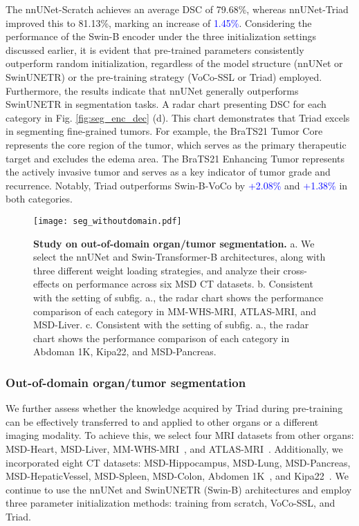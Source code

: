 The nnUNet-Scratch achieves an average DSC of 79.68\%, whereas nnUNet-Triad improved this to 81.13\%, marking an increase of \textcolor{blue}{1.45\%}. Considering the performance of the Swin-B encoder under the three initialization settings discussed earlier, it is evident that pre-trained parameters consistently outperform random initialization, regardless of the model structure (nnUNet or SwinUNETR) or the pre-training strategy (VoCo-SSL or Triad) employed.
Furthermore, the results indicate that nnUNet generally outperforms SwinUNETR in segmentation tasks. A radar chart presenting DSC for each category in Fig. \ref{fig:seg_enc_dec} (d). This chart demonstrates that Triad excels in segmenting fine-grained tumors.
For example, the BraTS21 Tumor Core represents the core region of the tumor, which serves as the primary therapeutic target and excludes the edema area. The BraTS21 Enhancing Tumor represents the actively invasive tumor and serves as a key indicator of tumor grade and recurrence. Notably, Triad outperforms Swin-B-VoCo by \textcolor{blue}{+2.08\%} and \textcolor{blue}{+1.38\%} in both categories.

\begin{figure}[!ht] 
	\centering
	\texttt{[image: seg\_withoutdomain.pdf]}
	\caption{\textbf{Study on out-of-domain organ/tumor segmentation.} a. We select the nnUNet and Swin-Transformer-B architectures, along with three different weight loading strategies, and analyze their cross-effects on performance across six MSD CT datasets. b. Consistent with the setting of subfig. a., the radar chart shows the performance comparison of each category in MM-WHS-MRI, ATLAS-MRI, and MSD-Liver. c. Consistent with the setting of subfig. a., the radar chart shows the performance comparison of each category in Abdoman 1K, Kipa22, and MSD-Pancreas.}
	\label{fig:seg_withoutdomain} 
\end{figure}

\subsubsection{Out-of-domain organ/tumor segmentation}

We further assess whether the knowledge acquired by Triad during pre-training can be effectively transferred to and applied to other organs or a different imaging modality.
To achieve this, we select four MRI datasets from other organs: MSD-Heart, MSD-Liver, MM-WHS-MRI~\citep{zhuang2018multivariate}, and ATLAS-MRI~\citep{quinton2023tumour}. Additionally, we incorporated eight CT datasets: MSD-Hippocampus, MSD-Lung, MSD-Pancreas, MSD-HepaticVessel, MSD-Spleen, MSD-Colon, Abdomen 1K~\citep{ma2021abdomenct}, and Kipa22~\citep{he2021meta}.
We continue to use the nnUNet and SwinUNETR (Swin-B) architectures and employ three parameter initialization methods: training from scratch, VoCo-SSL, and Triad.


